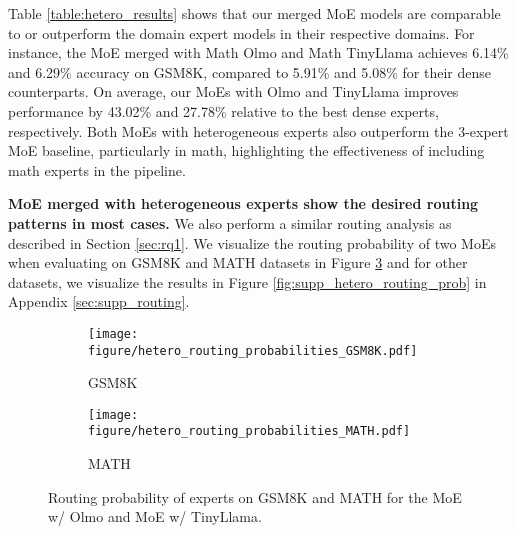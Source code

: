 
Table \ref{table:hetero_results} shows that our merged MoE models are comparable to or outperform the domain expert models in their respective domains. For instance, the MoE merged with Math Olmo and Math TinyLlama achieves 6.14\% and 6.29\% accuracy on GSM8K, compared to 5.91\% and 5.08\% for their dense counterparts. On average, our MoEs with Olmo and TinyLlama improves performance by 43.02\% and 27.78\% relative to the best dense experts, respectively. Both MoEs with heterogeneous experts also outperform the 3-expert MoE baseline, particularly in math, highlighting the effectiveness of including math experts in the pipeline.

\noindent \textbf{MoE merged with heterogeneous experts show the desired routing patterns in most cases.} \quad We also perform a similar routing analysis as described in Section \ref{sec:rq1}. We visualize the routing probability of two MoEs when evaluating on GSM8K and MATH datasets in Figure \ref{fig:hetero_routing_prob} and for other datasets, we visualize the results in Figure \ref{fig:supp_hetero_routing_prob} in Appendix \ref{sec:supp_routing}.

\begin{figure}[!t]
    \centering
    \begin{subfigure}[b]{0.48\columnwidth}
        \centering
        \texttt{[image: figure/hetero\_routing\_probabilities\_GSM8K.pdf]}
        \caption{GSM8K}
        \label{fig:hetero_gsm8k_route}
    \end{subfigure}
    \hfill
    \begin{subfigure}[b]{0.48\columnwidth}
        \centering
        \texttt{[image: figure/hetero\_routing\_probabilities\_MATH.pdf]}
        \caption{MATH}
        \label{fig:hetero_math_route}
    \end{subfigure}
    \caption{Routing probability of experts on GSM8K and MATH for the MoE w/ Olmo and MoE w/ TinyLlama.}
    \label{fig:hetero_routing_prob}
\end{figure}

